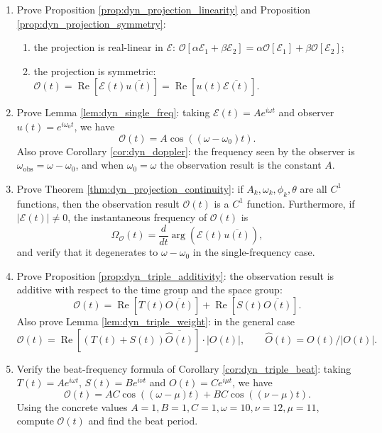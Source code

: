 \begin{enumerate}[leftmargin=3em, label=\textbf{Exercise \arabic*}]
    \item Prove Proposition \ref{prop:dyn_projection_linearity} and Proposition \ref{prop:dyn_projection_symmetry}:
    \begin{enumerate}[label=(\roman*)]
        \item the projection is real-linear in $\mathcal{E}$:
              $\mathcal{O}[\alpha\mathcal{E}_1+\beta\mathcal{E}_2]
              =\alpha\mathcal{O}[\mathcal{E}_1]+\beta\mathcal{O}[\mathcal{E}_2]$;
        \item the projection is symmetric:
              $\mathcal{O}(t)=\operatorname{Re}[\mathcal{E}(t)\overline{u(t)}]
              =\operatorname{Re}[u(t)\overline{\mathcal{E}(t)}]$.
    \end{enumerate}

    \item Prove Lemma \ref{lem:dyn_single_freq}:
    taking $\mathcal{E}(t)=Ae^{i\omega t}$ and observer $u(t)=e^{i\omega_0 t}$, we have
    \[
    \mathcal{O}(t)=A\cos((\omega-\omega_0)t).
    \]
    Also prove Corollary \ref{cor:dyn_doppler}: the frequency seen by the observer is
    $\omega_{\text{obs}}=\omega-\omega_0$,
    and when $\omega_0=\omega$ the observation result is the constant $A$.

    \item Prove Theorem \ref{thm:dyn_projection_continuity}:
    if $A_k,\omega_k,\phi_k,\theta$ are all $C^1$ functions,
    then the observation result $\mathcal{O}(t)$ is a $C^1$ function.
    Furthermore, if $|\mathcal{E}(t)|\neq0$, the instantaneous frequency of $\mathcal{O}(t)$ is
    \[
    \Omega_{\mathcal{O}}(t)=\frac{d}{dt}\arg(\mathcal{E}(t)\overline{u(t)}),
    \]
    and verify that it degenerates to $\omega-\omega_0$ in the single-frequency case.

    \item Prove Proposition \ref{prop:dyn_triple_additivity}:
    the observation result is additive with respect to the time group and the space group:
    \[
    \mathcal{O}(t)=\operatorname{Re}[T(t)\overline{O(t)}]
    +\operatorname{Re}[S(t)\overline{O(t)}].
    \]
    Also prove Lemma \ref{lem:dyn_triple_weight}:
    in the general case
    \[
    \mathcal{O}(t)=\operatorname{Re}[(T(t)+S(t))\overline{\widehat{O}(t)}]\cdot|O(t)|,
    \qquad
    \widehat{O}(t)=O(t)/|O(t)|.
    \]

    \item Verify the beat-frequency formula of Corollary \ref{cor:dyn_triple_beat}:
    taking $T(t)=Ae^{i\omega t}$, $S(t)=Be^{i\nu t}$ and $O(t)=Ce^{i\mu t}$,
    we have
    \[
    \mathcal{O}(t)=AC\cos((\omega-\mu)t)+BC\cos((\nu-\mu)t).
    \]
    Using the concrete values $A=1,B=1,C=1,\omega=10,\nu=12,\mu=11$,
    compute $\mathcal{O}(t)$ and find the beat period.


\end{enumerate}
